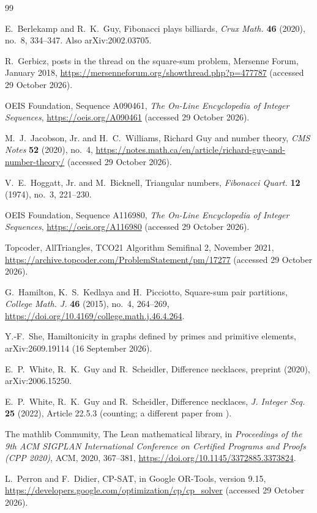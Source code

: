 \documentclass[11pt]{article}
\theoremstyle{definition}
\theoremstyle{remark}
\begin{document}
\begin{thebibliography}{99}

E.~Berlekamp and R.~K.~Guy, Fibonacci plays billiards, \emph{Crux Math.} \textbf{46} (2020),
no.~8, 334--347. Also arXiv:2002.03705.

R.~Gerbicz, posts in the thread on the square-sum problem, Mersenne Forum, January 2018,
\url{https://mersenneforum.org/showthread.php?p=477787} (accessed 29 October 2026).

OEIS Foundation, Sequence A090461, \emph{The On-Line Encyclopedia of Integer Sequences},
\url{https://oeis.org/A090461} (accessed 29 October 2026).

M.~J.~Jacobson, Jr. and H.~C.~Williams, Richard Guy and number theory, \emph{CMS Notes}
\textbf{52} (2020), no.~4,
\url{https://notes.math.ca/en/article/richard-guy-and-number-theory/} (accessed 29 October 2026).

V.~E.~Hoggatt, Jr. and M.~Bicknell, Triangular numbers, \emph{Fibonacci Quart.} \textbf{12} (1974),
no.~3, 221--230.

OEIS Foundation, Sequence A116980, \emph{The On-Line Encyclopedia of Integer Sequences},
\url{https://oeis.org/A116980} (accessed 29 October 2026).

Topcoder, AllTriangles, TCO21 Algorithm Semifinal 2, November 2021,
\url{https://archive.topcoder.com/ProblemStatement/pm/17277} (accessed 29 October 2026).

G.~Hamilton, K.~S.~Kedlaya and H.~Picciotto, Square-sum pair partitions, \emph{College Math. J.}
\textbf{46} (2015), no.~4, 264--269, \url{https://doi.org/10.4169/college.math.j.46.4.264}.

Y.-F.~She, Hamiltonicity in graphs defined by primes and primitive elements, arXiv:2609.19114
(16 September 2026).

E.~P.~White, R.~K.~Guy and R.~Scheidler, Difference necklaces, preprint (2020), arXiv:2006.15250.

E.~P.~White, R.~K.~Guy and R.~Scheidler, Difference necklaces, \emph{J. Integer Seq.} \textbf{25} (2022),
Article 22.5.3 (counting; a different paper from \cite{WGS}).

The mathlib Community, The Lean mathematical library, in \emph{Proceedings of the 9th ACM SIGPLAN
International Conference on Certified Programs and Proofs (CPP 2020)}, ACM, 2020, 367--381,
\url{https://doi.org/10.1145/3372885.3373824}.

L.~Perron and F.~Didier, CP-SAT, in Google OR-Tools, version 9.15,
\url{https://developers.google.com/optimization/cp/cp_solver} (accessed 29 October 2026).

\end{thebibliography}
\end{document}
